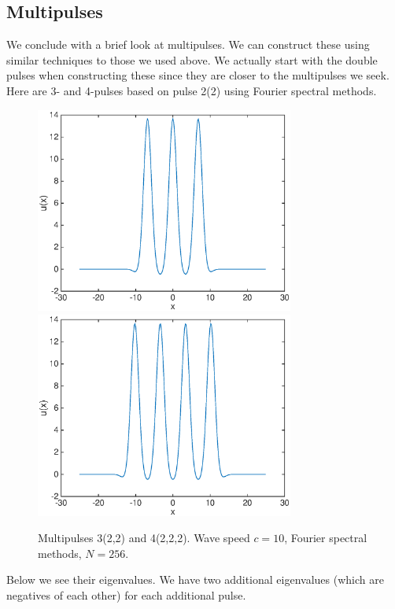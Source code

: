 \documentclass[12pt]{article}
\begin{document}
\subsection{Multipulses}

We conclude with a brief look at multipulses. We can construct these using similar techniques to those we used above. We actually start with the double pulses when constructing these since they are closer to the multipulses we seek. Here are 3- and 4-pulses based on pulse 2(2) using Fourier spectral methods.

\begin{figure}[H]
	\includegraphics[width=8.5cm]{four10um1_3}
	\includegraphics[width=8.5cm]{four10um1_4.eps}
	\caption{Multipulses 3(2,2) and 4(2,2,2). Wave speed $c = 10$, Fourier spectral methods, $N = 256$. }
\end{figure}

Below we see their eigenvalues. We have two additional eigenvalues (which are negatives of each other) for each additional pulse.
\end{document}
